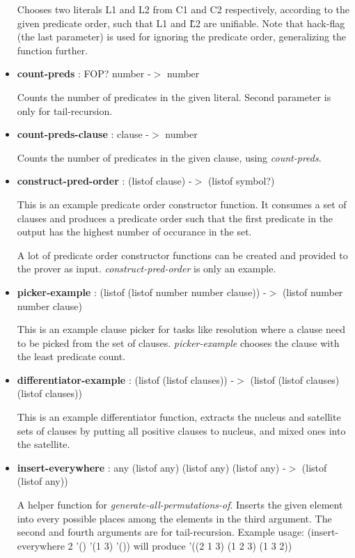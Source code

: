 \documentclass[11pt]{report}
\begin{document}
\begin{appendices}
\begin{itemize}
Chooses two literals L1 and L2 from C1 and C2 respectively, according to the given predicate order, such that L1 and \~L2 are unifiable. Note that hack-flag (the last parameter) is used for ignoring the predicate order, generalizing the function further.

 \item \textbf{count-preds} : FOP? number -$>$ number

Counts the number of predicates in the given literal. Second parameter is only for tail-recursion.

 \item \textbf{count-preds-clause} : clause -$>$ number

Counts the number of predicates in the given clause, using \textit{count-preds}.

 \item \textbf{construct-pred-order} : (listof clause) -$>$ (listof symbol?)

This is an example predicate order constructor function. It consumes a set of clauses and produces a predicate order such that the first predicate in the output has the highest number of occurance in the set. 

A lot of predicate order constructor functions can be created and provided to the prover as input. \textit{construct-pred-order} is only an example.

 \item \textbf{picker-example} : (listof (listof number number clause)) -$>$ (listof number number clause)

This is an example clause picker for tasks like resolution where a clause need to be picked from the set of clauses. \textit{picker-example} chooses the clause with the least predicate count.

 \item \textbf{differentiator-example} : (listof (listof clauses)) -$>$ (listof (listof clauses) (listof clauses))

This is an example differentiator function, extracts the nucleus and satellite sets of clauses by putting all positive clauses to nucleus, and mixed ones into the satellite.

 \item \textbf{insert-everywhere} : any (listof any) (listof any) (listof any) -$>$ (listof (listof any))

A helper function for \textit{generate-all-permutations-of}. Inserts the given element into every possible places among the elements in the third argument. The second and fourth arguments are for tail-recursion. Example usage: (insert-everywhere 2 '() '(1 3) '()) will produce '((2 1 3) (1 2 3) (1 3 2))


\end{itemize}
\end{appendices}
\end{document}
